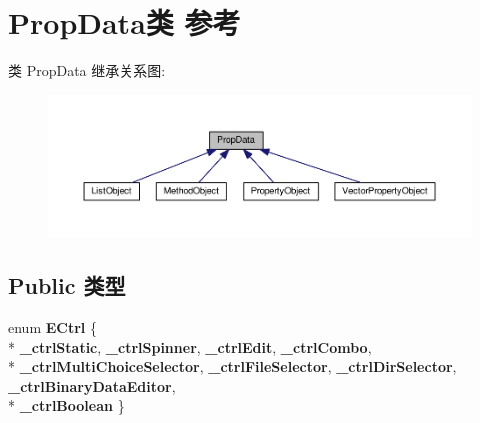 \hypertarget{class_prop_data}{\section{Prop\+Data类 参考}
\label{class_prop_data}
}


类 Prop\+Data 继承关系图\+:
\nopagebreak
\begin{figure}[H]
\begin{center}
\leavevmode
\includegraphics[width=350pt]{class_prop_data__inherit__graph}
\end{center}
\end{figure}
\subsection*{Public 类型}
\begin{DoxyCompactItemize}
\item 
\hypertarget{class_prop_data_a3d841df839abd00328d96df03eb0f626}{enum {\bfseries E\+Ctrl} \{ \\*
{\bfseries \+\_\+ctrl\+Static}, 
{\bfseries \+\_\+ctrl\+Spinner}, 
{\bfseries \+\_\+ctrl\+Edit}, 
{\bfseries \+\_\+ctrl\+Combo}, 
\\*
{\bfseries \+\_\+ctrl\+Multi\+Choice\+Selector}, 
{\bfseries \+\_\+ctrl\+File\+Selector}, 
{\bfseries \+\_\+ctrl\+Dir\+Selector}, 
{\bfseries \+\_\+ctrl\+Binary\+Data\+Editor}, 
\\*
{\bfseries \+\_\+ctrl\+Boolean}
 \}}\label{class_prop_data_a3d841df839abd00328d96df03eb0f626}

\end{DoxyCompactItemize}
